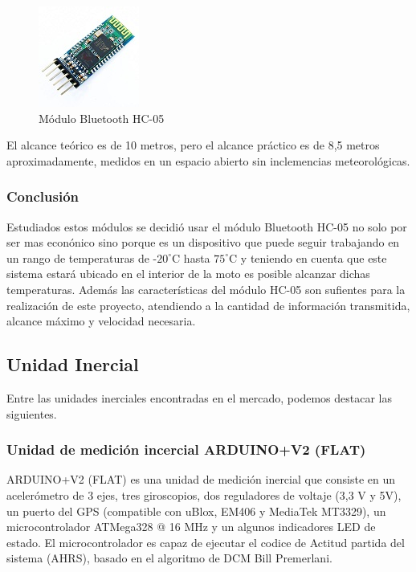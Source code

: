 				\begin{figure}[h]
					\centering
					\includegraphics{imagenes/HC05}
					\caption{Módulo Bluetooth HC-05}
					\label{contexto:figura}
				\end{figure}
				
				El alcance teórico es de 10 metros, pero el alcance práctico es de 8,5 metros aproximadamente, medidos en un espacio abierto sin inclemencias meteorológicas.
		
			\subsubsection{Conclusión}
			
			Estudiados estos módulos se decidió usar el módulo Bluetooth HC-05 no solo por ser mas econónico sino porque es un dispositivo que puede seguir trabajando en un rango de temperaturas de -$20^{\circ}$C hasta $75^{\circ}$C y teniendo en cuenta que este sistema estará ubicado en el interior de la moto es posible alcanzar dichas temperaturas. Además las características del módulo HC-05 son sufientes para la realización de este proyecto, atendiendo a la cantidad de información transmitida, alcance máximo y velocidad necesaria.
		
		
		\subsection{Unidad Inercial}
		
			Entre las unidades inerciales encontradas en el mercado, podemos destacar las siguientes.
		
			\subsubsection{Unidad de medición incercial ARDUINO+V2 (FLAT)}
			
				ARDUINO+V2 (FLAT) \cite{FLAT} es una unidad de medición inercial que consiste en un acelerómetro de 3 ejes, tres giroscopios, dos reguladores de voltaje (3,3 V y 5V), un puerto del GPS (compatible con uBlox, EM406 y MediaTek MT3329), un microcontrolador ATMega328 @ 16 MHz y un algunos indicadores LED de estado. El microcontrolador es capaz de ejecutar el codice de Actitud partida del sistema (AHRS), basado en el algoritmo de DCM Bill Premerlani.
				

